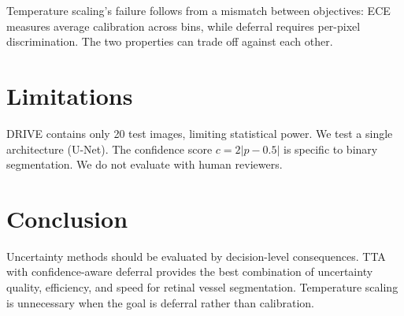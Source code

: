 \documentclass[smallextended]{svjour3}
\begin{document}
Temperature scaling's failure follows from a mismatch between objectives:
ECE measures average calibration across bins, while deferral requires
per-pixel discrimination. The two properties can trade off against each other.

\section{Limitations}

DRIVE contains only 20 test images, limiting statistical power. We test a
single architecture (U-Net). The confidence score $c = 2|p-0.5|$ is specific
to binary segmentation. We do not evaluate with human reviewers.

\section{Conclusion}

Uncertainty methods should be evaluated by decision-level consequences. TTA
with confidence-aware deferral provides the best combination of uncertainty
quality, efficiency, and speed for retinal vessel segmentation. Temperature
scaling is unnecessary when the goal is deferral rather than calibration.



\end{document}
